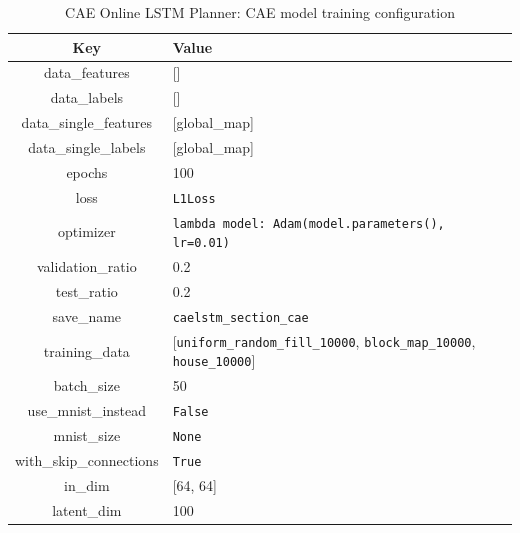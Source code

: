 \begin{table}[h!]
    \centerfloat
    \begin{tabular}{|c|M{10.5cm}|}
        \hline
        \textbf{Key} & \textbf{Value} \\
        \hline
     	data\_features & [] \\
     	\hline
    	data\_labels & [] \\
    	\hline
    	data\_single\_features & [global\_map] \\
    	\hline
    	data\_single\_labels & [global\_map] \\
    	\hline
    	epochs & 100 \\
    	\hline
    	loss & \texttt{L1Loss} \\
    	\hline
    	optimizer & \texttt{lambda model: Adam(model.parameters(), lr=0.01)} \\
    	\hline
    	validation\_ratio & 0.2 \\
    	\hline
    	test\_ratio & 0.2 \\
    	\hline
    	save\_name & \texttt{caelstm\_section\_cae} \\
    	\hline
    	training\_data & [\texttt{uniform\_random\_fill\_10000}, \texttt{block\_map\_10000}, \texttt{house\_10000}] \\
    	\hline
    	batch\_size & 50 \\
    	\hline
    	use\_mnist\_instead & \texttt{False} \\
    	\hline
    	mnist\_size & \texttt{None} \\
    	\hline
    	with\_skip\_connections & \texttt{True} \\
    	\hline
    	in\_dim & [64, 64] \\
    	\hline
	    latent\_dim & 100 \\
	    \hline
    \end{tabular}
    \caption{CAE Online LSTM Planner: CAE model training configuration}
    \label{tab: eval_training_cae_online_lstm_cae}
\end{table}

\pagebreak


